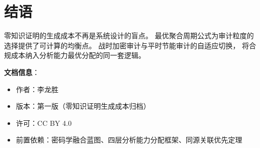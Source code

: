 \documentclass[11pt,a4paper]{article}
\begin{document}
\section{结语}

零知识证明的生成成本不再是系统设计的盲点。
最优聚合周期公式为审计粒度的选择提供了可计算的均衡点。
战时加密审计与平时节能审计的自适应切换，
将合规成本纳入分析能力最优分配的同一套逻辑。

\vspace{5mm}
\noindent\textbf{文档信息}：
\begin{itemize}
    \item 作者：李龙胜
    \item 版本：第一版（零知识证明生成成本归档）
    \item 许可：CC BY 4.0
    \item 前置依赖：密码学融合蓝图、四层分析能力分配框架、同源关联优先定理
\end{itemize}
\end{document}
